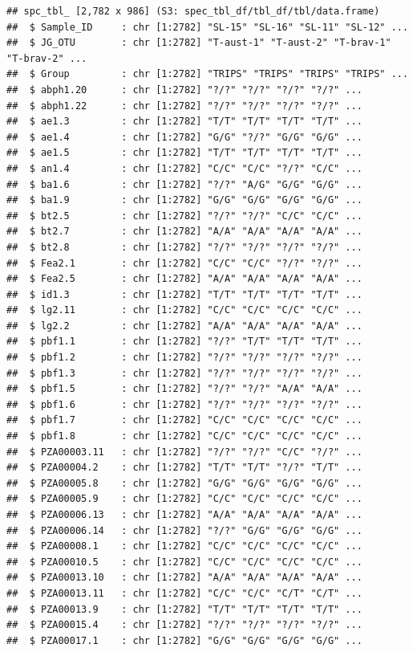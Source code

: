 \documentclass[
]{article}
\begin{document}
\begin{verbatim}
## spc_tbl_ [2,782 x 986] (S3: spec_tbl_df/tbl_df/tbl/data.frame)
##  $ Sample_ID     : chr [1:2782] "SL-15" "SL-16" "SL-11" "SL-12" ...
##  $ JG_OTU        : chr [1:2782] "T-aust-1" "T-aust-2" "T-brav-1" "T-brav-2" ...
##  $ Group         : chr [1:2782] "TRIPS" "TRIPS" "TRIPS" "TRIPS" ...
##  $ abph1.20      : chr [1:2782] "?/?" "?/?" "?/?" "?/?" ...
##  $ abph1.22      : chr [1:2782] "?/?" "?/?" "?/?" "?/?" ...
##  $ ae1.3         : chr [1:2782] "T/T" "T/T" "T/T" "T/T" ...
##  $ ae1.4         : chr [1:2782] "G/G" "?/?" "G/G" "G/G" ...
##  $ ae1.5         : chr [1:2782] "T/T" "T/T" "T/T" "T/T" ...
##  $ an1.4         : chr [1:2782] "C/C" "C/C" "?/?" "C/C" ...
##  $ ba1.6         : chr [1:2782] "?/?" "A/G" "G/G" "G/G" ...
##  $ ba1.9         : chr [1:2782] "G/G" "G/G" "G/G" "G/G" ...
##  $ bt2.5         : chr [1:2782] "?/?" "?/?" "C/C" "C/C" ...
##  $ bt2.7         : chr [1:2782] "A/A" "A/A" "A/A" "A/A" ...
##  $ bt2.8         : chr [1:2782] "?/?" "?/?" "?/?" "?/?" ...
##  $ Fea2.1        : chr [1:2782] "C/C" "C/C" "?/?" "?/?" ...
##  $ Fea2.5        : chr [1:2782] "A/A" "A/A" "A/A" "A/A" ...
##  $ id1.3         : chr [1:2782] "T/T" "T/T" "T/T" "T/T" ...
##  $ lg2.11        : chr [1:2782] "C/C" "C/C" "C/C" "C/C" ...
##  $ lg2.2         : chr [1:2782] "A/A" "A/A" "A/A" "A/A" ...
##  $ pbf1.1        : chr [1:2782] "?/?" "T/T" "T/T" "T/T" ...
##  $ pbf1.2        : chr [1:2782] "?/?" "?/?" "?/?" "?/?" ...
##  $ pbf1.3        : chr [1:2782] "?/?" "?/?" "?/?" "?/?" ...
##  $ pbf1.5        : chr [1:2782] "?/?" "?/?" "A/A" "A/A" ...
##  $ pbf1.6        : chr [1:2782] "?/?" "?/?" "?/?" "?/?" ...
##  $ pbf1.7        : chr [1:2782] "C/C" "C/C" "C/C" "C/C" ...
##  $ pbf1.8        : chr [1:2782] "C/C" "C/C" "C/C" "C/C" ...
##  $ PZA00003.11   : chr [1:2782] "?/?" "?/?" "C/C" "?/?" ...
##  $ PZA00004.2    : chr [1:2782] "T/T" "T/T" "?/?" "T/T" ...
##  $ PZA00005.8    : chr [1:2782] "G/G" "G/G" "G/G" "G/G" ...
##  $ PZA00005.9    : chr [1:2782] "C/C" "C/C" "C/C" "C/C" ...
##  $ PZA00006.13   : chr [1:2782] "A/A" "A/A" "A/A" "A/A" ...
##  $ PZA00006.14   : chr [1:2782] "?/?" "G/G" "G/G" "G/G" ...
##  $ PZA00008.1    : chr [1:2782] "C/C" "C/C" "C/C" "C/C" ...
##  $ PZA00010.5    : chr [1:2782] "C/C" "C/C" "C/C" "C/C" ...
##  $ PZA00013.10   : chr [1:2782] "A/A" "A/A" "A/A" "A/A" ...
##  $ PZA00013.11   : chr [1:2782] "C/C" "C/C" "C/T" "C/T" ...
##  $ PZA00013.9    : chr [1:2782] "T/T" "T/T" "T/T" "T/T" ...
##  $ PZA00015.4    : chr [1:2782] "?/?" "?/?" "?/?" "?/?" ...
##  $ PZA00017.1    : chr [1:2782] "G/G" "G/G" "G/G" "G/G" ...

\end{verbatim}
\end{document}

